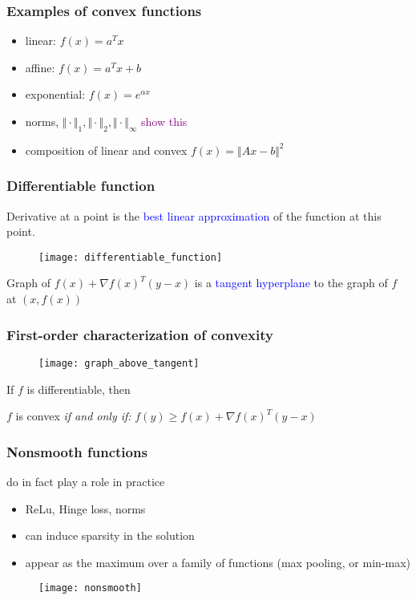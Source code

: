 \documentclass{beamer}
\begin{document}
\begin{frame}
  \frametitle{Examples of convex functions}
  \begin{itemize}
    \item linear: $f(x) = a^T x$
    \item affine: $f(x) = a^T x + b$
    \item exponential: $f(x) = e^{\alpha x}$
    \item norms, $\Vert \cdot \Vert_1, \Vert \cdot \Vert_2, \Vert \cdot \Vert_\infty$ \hfill \textcolor{purple}{show this}
    \item composition of linear and convex $f(x)=\Vert Ax-b  \Vert^2$
  \end{itemize}

\end{frame}


\begin{frame}
  \frametitle{Differentiable function}
  Derivative at a point is the \textcolor{blue}{best linear approximation} of the function at this point.
  \begin{figure}[ht]
    \centering
    \texttt{[image: differentiable\_function]}
  \end{figure}
  \begin{center}
    Graph of $f(x)+ {\nabla f(x)}^T (y-x)$ is a \textcolor{blue}{tangent hyperplane} to the graph of $f$ at $(x,f(x))$
  \end{center}
\end{frame}


\begin{frame}
  \frametitle{First-order characterization of convexity}

  \begin{figure}[ht]
    \centering
    \texttt{[image: graph\_above\_tangent]}
  \end{figure}
  If $f$ is differentiable, then
  \begin{center}
    $f$ is convex \emph{if and only if:} $f(y) \ge f(x) + {\nabla f(x)}^T (y-x)$
  \end{center}
\end{frame}


\begin{frame}
  \frametitle{Nonsmooth functions }
  do in fact play a role in practice
  \begin{itemize}
    \item ReLu, Hinge loss, norms
    \item can induce sparsity in the solution
    \item appear as the maximum over a family of functions (max pooling, or min-max)
  \end{itemize}
  \begin{figure}[ht]
    \centering
    \texttt{[image: nonsmooth]}
  \end{figure}


\end{frame}
\end{document}
